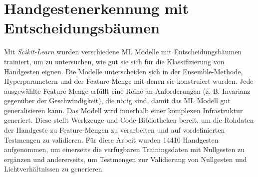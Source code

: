\chapter{Handgestenerkennung mit Entscheidungsbäumen}
Mit \textit{Scikit-Learn} wurden verschiedene ML Modelle mit Entscheidungsbäumen trainiert, um zu untersuchen, wie gut sie sich für die Klassifizierung von Handgesten eignen.
Die Modelle unterscheiden sich in der Ensemble-Methode, Hyperparametern und der Feature-Menge mit denen sie konstruiert wurden. Jede ausgewählte Feature-Menge erfüllt eine Reihe an Anforderungen (z. B.
Invarianz gegenüber der Geschwindigkeit), die nötig sind, damit das ML Modell gut generalisieren kann.
\newline
\newline
Das Modell wird innerhalb einer komplexen Infrastruktur generiert. Diese stellt Werkzeuge und Code-Bibliotheken bereit, um die Rohdaten der Handgeste zu Feature-Mengen zu verarbeiten und auf vordefinierten
Testmengen zu validieren. Für diese Arbeit wurden 14410 Handgesten aufgenommen, um einerseits die verfügbaren Trainingsdaten mit Nullgesten zu ergänzen und andererseits, um Testmengen zur Validierung von Nullgesten
und Lichtverhältnissen zu generieren.




